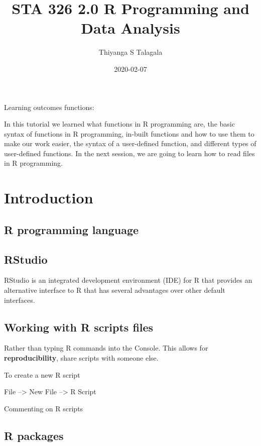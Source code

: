 \documentclass[
]{book}
\title{STA 326 2.0 R Programming and Data Analysis}
\author{Thiyanga S Talagala}
\date{2020-02-07}
\begin{document}
\maketitle

{
\setcounter{tocdepth}{1}
\tableofcontents
}
Learning outcomes functions:

In this tutorial we learned what functions in R programming are, the basic syntax of functions in R programming, in-built functions and how to use them to make our work easier, the syntax of a user-defined function, and different types of user-defined functions. In the next session, we are going to learn how to read files in R programming.

\hypertarget{elements}{%
\chapter{Introduction}\label{elements}}

\hypertarget{r-programming-language}{%
\section{R programming language}\label{r-programming-language}}

\hypertarget{rstudio}{%
\section{RStudio}\label{rstudio}}

RStudio is an integrated development environment (IDE) for R that provides an alternative interface to R that has several advantages over other default interfaces.

\hypertarget{working-with-r-scripts-files}{%
\section{Working with R scripts files}\label{working-with-r-scripts-files}}

Rather than typing R commands into the Console. This allows for \textbf{reproducibility}, share scripts with someone else.

To create a new R script

File --\textgreater{} New File --\textgreater{} R Script

Commenting on R scripts

\hypertarget{r-packages}{%
\section{R packages}\label{r-packages}}
\end{document}
